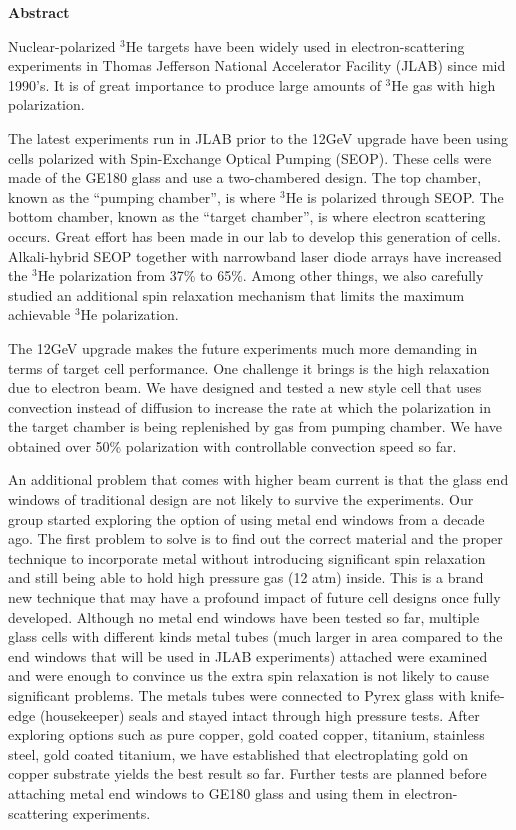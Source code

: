 \begin{center}
\textbf{\large Abstract}
\end{center}

Nuclear-polarized $^{3}$He targets have been widely used in electron-scattering experiments in Thomas Jefferson National Accelerator Facility (JLAB) since mid 1990’s.  It is of great importance to produce large amounts of $^{3}$He gas with high polarization. 

The latest experiments run in JLAB prior to the 12GeV upgrade have been using cells polarized with Spin-Exchange Optical Pumping (SEOP). These cells were made of the GE180 glass and use a two-chambered design. The top chamber, known as the “pumping chamber”, is where $^{3}$He is polarized through SEOP. The bottom chamber, known as the “target chamber”, is where electron scattering occurs. Great effort has been made in our lab to develop this generation of cells. Alkali-hybrid SEOP together with narrowband laser diode arrays have increased the $^{3}$He polarization from 37\% to 65\%. Among other things, we also carefully studied an additional spin relaxation mechanism that limits the maximum achievable $^{3}$He polarization. 

The 12GeV upgrade makes the future experiments much more demanding in terms of target cell performance. One challenge it brings is the high relaxation due to electron beam. We have designed and tested a new style cell that uses convection instead of diffusion to increase the rate at which the polarization in the target chamber is being replenished by gas from pumping chamber. We have obtained over 50\% polarization with controllable convection speed so far.

An additional problem that comes with higher beam current is that the glass end windows of traditional design are not likely to survive the experiments. Our group started exploring the option of using metal end windows from a decade ago. The first problem to solve is to find out the correct material and the proper technique to incorporate metal without introducing significant spin relaxation and still being able to hold high pressure gas (12 atm) inside. This is a brand new technique that may have a profound impact of future cell designs once fully developed. Although no metal end windows have been tested so far, multiple glass cells with different kinds metal tubes (much larger in area compared to the end windows that will be used in JLAB experiments) attached were examined and were enough to convince us the extra spin relaxation is not likely to cause significant problems. The metals tubes were connected to Pyrex glass with knife-edge (housekeeper) seals and stayed intact through high pressure tests. After exploring options such as pure copper, gold coated copper, titanium, stainless steel, gold coated titanium, we have established that electroplating gold on copper substrate yields the best result so far. Further tests are planned before attaching metal end windows to GE180 glass and using them in electron-scattering experiments.

